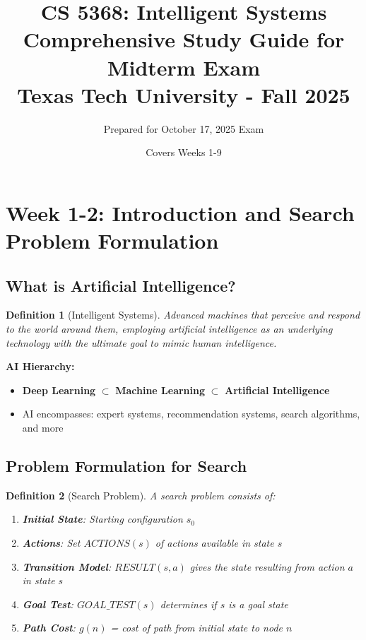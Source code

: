 \documentclass[11pt,letterpaper]{article}
\title{\textbf{CS 5368: Intelligent Systems}\\
\Large Comprehensive Study Guide for Midterm Exam\\
\large Texas Tech University - Fall 2025}
\author{Prepared for October 17, 2025 Exam}
\date{Covers Weeks 1-9}
\newtheorem{definition}{Definition}[section]
\begin{document}
\maketitle
\tableofcontents
\newpage

\section{Week 1-2: Introduction and Search Problem Formulation}

\subsection{What is Artificial Intelligence?}

\begin{definition}[Intelligent Systems]
Advanced machines that perceive and respond to the world around them, employing artificial intelligence as an underlying technology with the ultimate goal to mimic human intelligence.
\end{definition}

\begin{concept}
\textbf{AI Hierarchy:}
\begin{itemize}
    \item \textbf{Deep Learning} $\subset$ \textbf{Machine Learning} $\subset$ \textbf{Artificial Intelligence}
    \item AI encompasses: expert systems, recommendation systems, search algorithms, and more
\end{itemize}
\end{concept}

\subsection{Problem Formulation for Search}

\begin{definition}[Search Problem]
A search problem consists of:
\begin{enumerate}
    \item \textbf{Initial State}: Starting configuration $s_0$
    \item \textbf{Actions}: Set $ACTIONS(s)$ of actions available in state $s$
    \item \textbf{Transition Model}: $RESULT(s, a)$ gives the state resulting from action $a$ in state $s$
    \item \textbf{Goal Test}: $GOAL\_TEST(s)$ determines if $s$ is a goal state
    \item \textbf{Path Cost}: $g(n)$ = cost of path from initial state to node $n$
\end{enumerate}
\end{definition}
\end{document}
